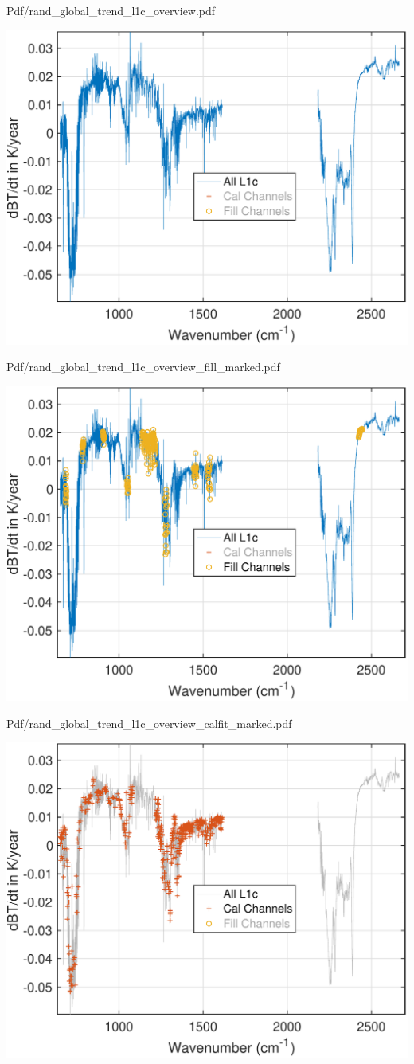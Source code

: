\documentclass[presentation]{beamer}
\begin{document}
\begin{frame}[label={sec:org11de096}]{Pdf/rand\_global\_trend\_l1c\_overview.pdf}
\begin{center}
\includegraphics[width=0.7\linewidth]{./Figs/Pdf/rand_global_trend_l1c_overview.pdf}
\end{center}
\end{frame}


\begin{frame}[label={sec:orgf14073b}]{Pdf/rand\_global\_trend\_l1c\_overview\_fill\_marked.pdf}
\begin{center}
\includegraphics[width=0.7\linewidth]{./Figs/Pdf/rand_global_trend_l1c_overview_fill_marked.pdf}
\end{center}
\end{frame}

\begin{frame}[label={sec:orgf9df2ff}]{Pdf/rand\_global\_trend\_l1c\_overview\_calfit\_marked.pdf}
\begin{center}
\includegraphics[width=0.7\linewidth]{./Figs/Pdf/rand_global_trend_l1c_overview_calfit_marked.pdf}
\end{center}
\end{frame}
\end{document}
